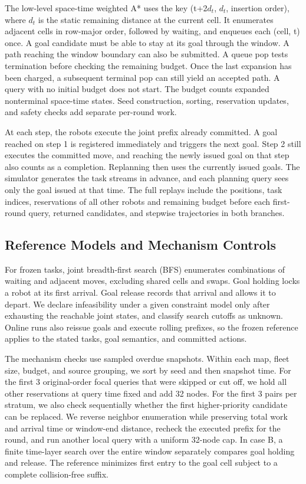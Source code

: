 \documentclass{article}
\begin{document}
The low-level space-time weighted A* uses the key (t+2$d_t$, $d_t$, insertion order), where $d_t$ is the static remaining distance at the current cell. It enumerates adjacent cells in row-major order, followed by waiting, and enqueues each (cell, t) once. A goal candidate must be able to stay at its goal through the window. A path reaching the window boundary can also be submitted. A queue pop tests termination before checking the remaining budget. Once the last expansion has been charged, a subsequent terminal pop can still yield an accepted path. A query with no initial budget does not start. The budget counts expanded nonterminal space-time states. Seed construction, sorting, reservation updates, and safety checks add separate per-round work.

At each step, the robots execute the joint prefix already committed. A goal reached on step 1 is registered immediately and triggers the next goal. Step 2 still executes the committed move, and reaching the newly issued goal on that step also counts as a completion. Replanning then uses the currently issued goals. The simulator generates the task streams in advance, and each planning query sees only the goal issued at that time. The full replays include the positions, task indices, reservations of all other robots and remaining budget before each first-round query, returned candidates, and stepwise trajectories in both branches.

\subsection{Reference Models and Mechanism Controls}
For frozen tasks, joint breadth-first search (BFS) enumerates combinations of waiting and adjacent moves, excluding shared cells and swaps. Goal holding locks a robot at its first arrival. Goal release records that arrival and allows it to depart. We declare infeasibility under a given constraint model only after exhausting the reachable joint states, and classify search cutoffs as unknown. Online runs also reissue goals and execute rolling prefixes, so the frozen reference applies to the stated tasks, goal semantics, and committed actions.

The mechanism checks use sampled overdue snapshots. Within each map, fleet size, budget, and source grouping, we sort by seed and then snapshot time. For the first 3 original-order focal queries that were skipped or cut off, we hold all other reservations at query time fixed and add 32 nodes. For the first 3 pairs per stratum, we also check sequentially whether the first higher-priority candidate can be replaced. We reverse neighbor enumeration while preserving total work and arrival time or window-end distance, recheck the executed prefix for the round, and run another local query with a uniform 32-node cap. In case B, a finite time-layer search over the entire window separately compares goal holding and release. The reference minimizes first entry to the goal cell subject to a complete collision-free suffix.
\end{document}
